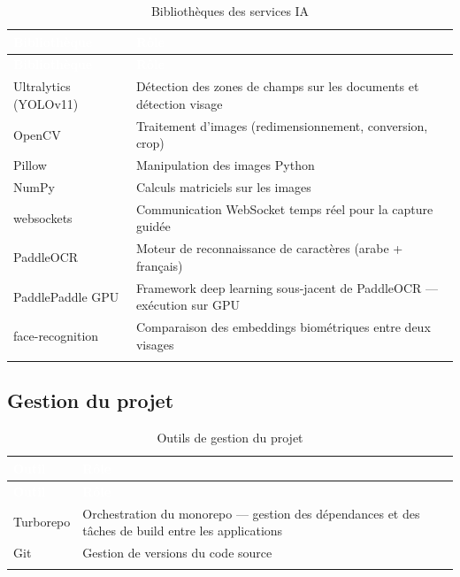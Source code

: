 \renewcommand{\arraystretch}{1.3}
\begin{longtable}{|p{4.5cm}|p{10cm}|}
  \rowcolor{bleu_principal}
  \textcolor{white}{\textbf{Bibliothèque}} & \textcolor{white}{\textbf{Rôle}} \\
  \hline
  \endfirsthead
  \rowcolor{bleu_principal}
  \textcolor{white}{\textbf{Bibliothèque}} & \textcolor{white}{\textbf{Rôle}} \\
  \hline
  \endhead
  Ultralytics (YOLOv11) & Détection des zones de champs sur les documents et détection visage \\ \hline
  OpenCV                & Traitement d'images (redimensionnement, conversion, crop) \\ \hline
  Pillow                & Manipulation des images Python \\ \hline
  NumPy                 & Calculs matriciels sur les images \\ \hline
  websockets            & Communication WebSocket temps réel pour la capture guidée \\ \hline
  PaddleOCR             & Moteur de reconnaissance de caractères (arabe + français) \\ \hline
  PaddlePaddle GPU      & Framework deep learning sous-jacent de PaddleOCR --- exécution sur GPU \\ \hline
  face-recognition      & Comparaison des embeddings biométriques entre deux visages \\ \hline
  \caption{Bibliothèques des services IA}
  \label{tab:ch6-ia}
\end{longtable}

\subsection{Gestion du projet}
\label{subsec:gestion-projet}

\renewcommand{\arraystretch}{1.3}
\begin{longtable}{|p{4cm}|p{10.5cm}|}
  \rowcolor{bleu_principal}
  \textcolor{white}{\textbf{Outil}} & \textcolor{white}{\textbf{Rôle}} \\
  \hline
  \endfirsthead
  \rowcolor{bleu_principal}
  \textcolor{white}{\textbf{Outil}} & \textcolor{white}{\textbf{Rôle}} \\
  \hline
  \endhead
  Turborepo & Orchestration du monorepo --- gestion des dépendances et des tâches de build entre les applications \\ \hline
  Git       & Gestion de versions du code source \\ \hline
  \caption{Outils de gestion du projet}
  \label{tab:ch6-gestion}
\end{longtable}


